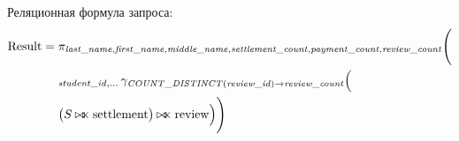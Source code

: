 Реляционная формула запроса:
\begin{align*}
\text{Result} = {} & \pi_{\mathit{last\_name}, \mathit{first\_name}, \mathit{middle\_name}, \mathit{settlement\_count}, \mathit{payment\_count}, \mathit{review\_count}} \Biggl( \\
& {}_{\mathit{student\_id}, \dots} \, \gamma_{\mathit{COUNT\_DISTINCT}(\mathit{review\_id}) \rightarrow \mathit{review\_count}} \Bigl( \\
& \big( S \mathbin{\bowtie\mkern-11.5mu\ltimes} \text{settlement} \big) \mathbin{\bowtie\mkern-11.5mu\ltimes} \text{review} \Bigr) \Biggr)
\end{align*}






